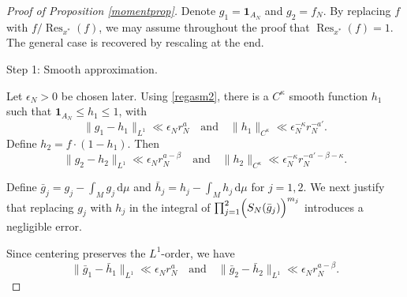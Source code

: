 \documentclass[10pt,a4paper]{amsart}
\def\one{{\mathbf{1}}}
\newcommand{\Res}{\operatorname{Res}}
\renewcommand{\d}{\, \text{d}}
\begin{document}
\begin{proof}[Proof of Proposition \ref{momentprop}]
Denote $g_1=\one_{A_N}$ and $g_2=f_N$. By replacing $f$ with $f/\Res_{x^*}(f)$, we may assume throughout the proof that $\Res_{x^*}(f)=1$. The general case is recovered by rescaling at the end.






Step 1: Smooth approximation.

Let $\epsilon_N>0$ be chosen later. Using \eqref{regasm2}, there is a $C^{\kappa}$ smooth function $h_1$ such that $\one_{A_N}\le h_1\le 1$, with
\begin{equation*}
\|g_1- h_1\|_{L^1} \ll \epsilon_N r_N^a \quad \text{and} \quad \|h_1\|_{C^{\kappa}} \ll \epsilon_N^{-\kappa} r_N^{-a'}.
\end{equation*}
Define $h_2= f \cdot (1-h_1)$. Then
\begin{equation*}
\|g_2 - h_2 \|_{L^1} \ll \epsilon_N r_N^{a-\beta} \quad \text{and} \quad \|h_2\|_{C^{\kappa}} \ll \epsilon_N^{-\kappa} r_N^{-a'-\beta-\kappa}.
\end{equation*}


Define $\bar{g}_j=g_j-\int_M g_j \d\mu$ and $\bar{h}_j=h_j - \int_M h_j \d\mu$ for $j=1, 2.$ We next justify that replacing $g_j$ with $h_j$ in the integral of $\prod_{j=1}^2 \Bigl(S_N(\bar{g}_j)\Bigr)^{m_j}$ introduces a negligible error.

Since centering preserves the $L^1$-order, we have
\begin{equation}\label{cL1e}
\|\bar g_1-\bar h_1\|_{L^1}\ll \epsilon_N r_N^a
\quad \text{and} \quad
\|\bar g_2-\bar h_2\|_{L^1}\ll \epsilon_N r_N^{a-\beta}.
\end{equation}



\end{proof}
\end{document}
